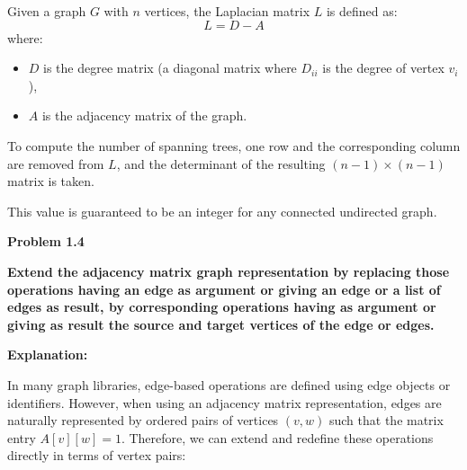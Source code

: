\documentclass{article}
\begin{document}
Given a graph \( G \) with \( n \) vertices, the Laplacian matrix \( L \) is defined as:
\[
L = D - A
\]
where:
\begin{itemize}
    \item \( D \) is the degree matrix (a diagonal matrix where \( D_{ii} \) is the degree of vertex \( v_i \)),
    \item \( A \) is the adjacency matrix of the graph.
\end{itemize}

To compute the number of spanning trees, one row and the corresponding column are removed from \( L \), and the determinant of the resulting \((n-1) \times (n-1)\) matrix is taken.

This value is guaranteed to be an integer for any connected undirected graph.

\textbf{Problem 1.4}

\textbf{Extend the adjacency matrix graph representation by replacing those operations having an edge as argument or giving an edge or a list of edges as result, by corresponding operations having as argument or giving as result the source and target vertices of the edge or edges.}

\textbf{Explanation:}

In many graph libraries, edge-based operations are defined using edge objects or identifiers. However, when using an adjacency matrix representation, edges are naturally represented by ordered pairs of vertices \((v, w)\) such that the matrix entry \(A[v][w] = 1\). Therefore, we can extend and redefine these operations directly in terms of vertex pairs:
\end{document}
